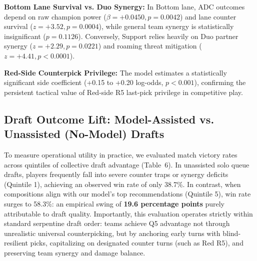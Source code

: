 \documentclass[11pt,letterpaper]{article}
\begin{document}
\vspace{0.2em}
\noindent \textbf{Bottom Lane Survival vs. Duo Synergy:} In Bottom lane, ADC outcomes depend on raw champion power ($\beta = +0.0450, p = 0.0042$) and lane counter survival ($z = +3.52, p = 0.0004$), while general team synergy is statistically insignificant ($p = 0.1126$). Conversely, Support relies heavily on Duo partner synergy ($z = +2.29, p = 0.0221$) and roaming threat mitigation ($z = +4.41, p < 0.0001$).

\vspace{0.2em}
\noindent \textbf{Red-Side Counterpick Privilege:} The model estimates a statistically significant side coefficient (+0.15 to +0.20 log-odds, $p < 0.001$), confirming the persistent tactical value of Red-side R5 last-pick privilege in competitive play.

\clearpage

\enlargethispage{2.5\baselineskip}
\subsection{Draft Outcome Lift: Model-Assisted vs. Unassisted (No-Model) Drafts}

To measure operational utility in practice, we evaluated match victory rates across quintiles of collective draft advantage (Table~6). In unassisted solo queue drafts, players frequently fall into severe counter traps or synergy deficits (Quintile 1), achieving an observed win rate of only 38.7\%. In contrast, when compositions align with our model's top recommendations (Quintile 5), win rate surges to 58.3\%: an empirical swing of \textbf{19.6 percentage points} purely attributable to draft quality. Importantly, this evaluation operates strictly within standard serpentine draft order: teams achieve Q5 advantage not through unrealistic universal counterpicking, but by anchoring early turns with blind-resilient picks, capitalizing on designated counter turns (such as Red R5), and preserving team synergy and damage balance.
\end{document}
